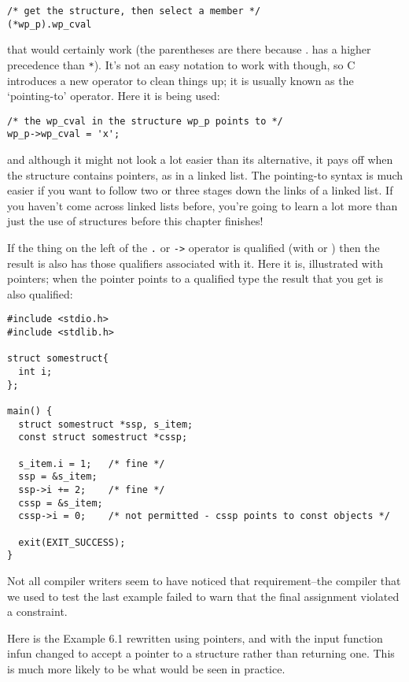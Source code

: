    \begin{Verbatim}
/* get the structure, then select a member */
(*wp_p).wp_cval
\end{Verbatim}

   that would certainly work (the parentheses are there because . has
    a higher precedence than \texttt{*}). It's not an easy notation to work
    with though, so C introduces a new operator to clean things up; it is
    usually known as the `pointing-to' operator. Here it is being
    used:


   \begin{Verbatim}
/* the wp_cval in the structure wp_p points to */
wp_p->wp_cval = 'x';
\end{Verbatim}

   and although it might not look a lot easier than its alternative, it pays
    off when the structure contains pointers, as in a linked list. The
    pointing-to syntax is much easier if you want to follow two or three stages
    down the links of a linked list. If you haven't come across linked lists
    before, you're going to learn a lot more than just the use of structures
    before this chapter finishes!


   If the thing on the left of the \texttt{.} or \texttt{->}
    operator is qualified (with \const{} or \volatile{})
    then the result is also has those qualifiers associated with it. Here it
    is, illustrated with pointers; when the pointer points to a qualified type
    the result that you get is also qualified:


   \begin{Verbatim}
#include <stdio.h>
#include <stdlib.h>

struct somestruct{
  int i;
};

main() {
  struct somestruct *ssp, s_item;
  const struct somestruct *cssp;

  s_item.i = 1;   /* fine */
  ssp = &s_item;
  ssp->i += 2;    /* fine */
  cssp = &s_item;
  cssp->i = 0;    /* not permitted - cssp points to const objects */

  exit(EXIT_SUCCESS);
}
\end{Verbatim}

   Not all compiler writers seem to have noticed that requirement--the
    compiler that we used to test the last example failed to warn that the
    final assignment violated a constraint.


   Here is the Example 6.1 rewritten using pointers, and with
    the input function infun changed to accept a pointer to a structure rather
    than returning one. This is much more likely to be what would be seen in
    practice.


